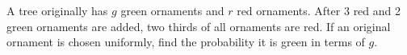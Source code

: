 A tree originally has $g$ green ornaments and $r$ red ornaments. After 3 red and 2 green ornaments are added, two thirds of all ornaments are red. If an original ornament is chosen uniformly, find the probability it is green in terms of $g$.
